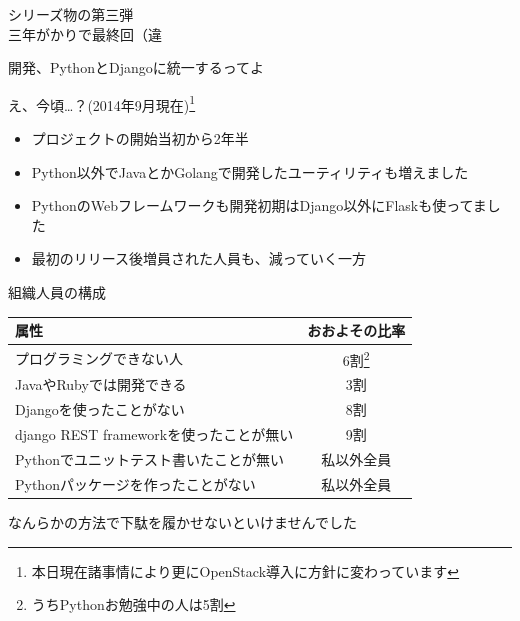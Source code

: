 \begin{frame}
  \begin{center}
    {\Huge シリーズ物の第三弾\\三年がかりで最終回（違}
  \end{center}
\end{frame}

\begin{frame}{開発、PythonとDjangoに統一するってよ}

  え、今頃…？(2014年9月現在)\footnote{本日現在諸事情により更にOpenStack導入に方針に変わっています}
  \begin{itemize}
  \item プロジェクトの開始当初から2年半
  \item Python以外でJavaとかGolangで開発したユーティリティも増えました
  \item PythonのWebフレームワークも開発初期はDjango以外にFlaskも使ってました
  \item 最初のリリース後増員された人員も、減っていく一方
  \end{itemize}

\end{frame}

\begin{frame}{組織人員の構成}

  \begin{tabular}{|l|c|}
    \hline
    属性 & おおよその比率 \\
    \hline
    プログラミングできない人 & 6割\footnote{うちPythonお勉強中の人は5割} \\
    JavaやRubyでは開発できる & 3割 \\
    Djangoを使ったことがない & 8割 \\
    {\scriptsize django REST framework}を使ったことが無い & 9割 \\
    Pythonでユニットテスト書いたことが無い & 私以外全員 \\
    Pythonパッケージを作ったことがない & 私以外全員 \\
    \hline
  \end{tabular}

  なんらかの方法で下駄を履かせないといけませんでした

\end{frame}

